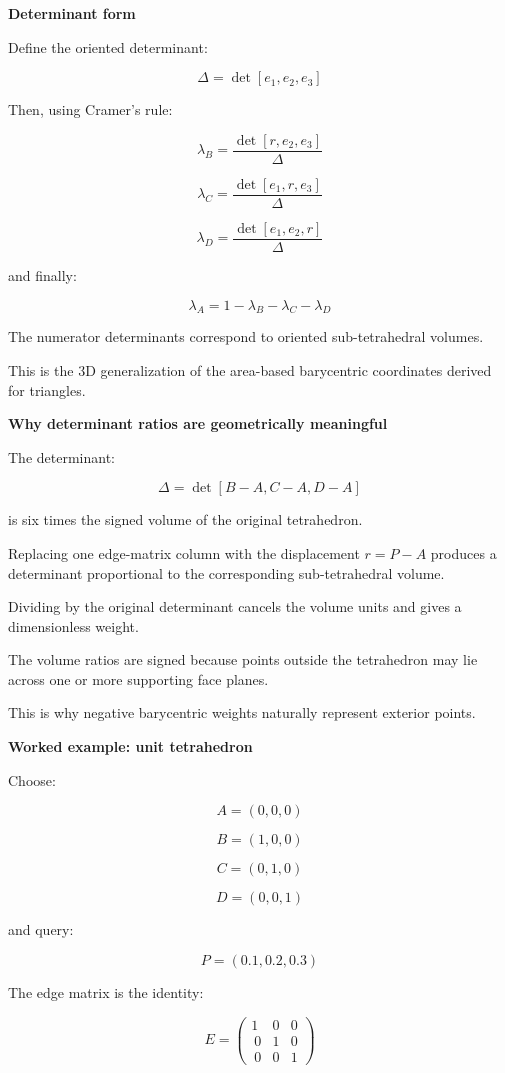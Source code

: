 \textbf{Determinant form}

Define the oriented determinant:

\[
\Delta= \det[e_1,e_2,e_3]
\]

Then, using Cramer's rule:

\[
\boxed{ \lambda_B= \frac{\det[r,e_2,e_3]}{\Delta} }
\]

\[
\boxed{ \lambda_C= \frac{\det[e_1,r,e_3]}{\Delta} }
\]

\[
\boxed{ \lambda_D= \frac{\det[e_1,e_2,r]}{\Delta} }
\]

and finally:

\[
\boxed{ \lambda_A=1-\lambda_B-\lambda_C-\lambda_D }
\]

The numerator determinants correspond to oriented sub-tetrahedral volumes.

This is the 3D generalization of the area-based barycentric coordinates derived for triangles.

\textbf{Why determinant ratios are geometrically meaningful}

The determinant:

\[
\Delta=\det[B-A,C-A,D-A]
\]

is six times the signed volume of the original tetrahedron.

Replacing one edge-matrix column with the displacement \(r=P-A\) produces a determinant proportional to the corresponding sub-tetrahedral volume.

Dividing by the original determinant cancels the volume units and gives a dimensionless weight.

The volume ratios are signed because points outside the tetrahedron may lie across one or more supporting face planes.

This is why negative barycentric weights naturally represent exterior points.

\textbf{Worked example: unit tetrahedron}

Choose:

\[
A=(0,0,0)
\]

\[
B=(1,0,0)
\]

\[
C=(0,1,0)
\]

\[
D=(0,0,1)
\]

and query:

\[
P=(0.1,0.2,0.3)
\]

The edge matrix is the identity:

\[
E= \begin{pmatrix} 1&0&0\\\ 0&1&0\\\ 0&0&1 \end{pmatrix}
\]

